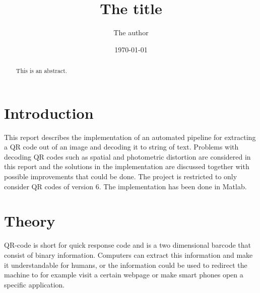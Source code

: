 \documentclass[12pt,a4paper]{article}
\begin{document}
 
\title{The title}
\author{The author}
\date{\today}
 
 
\newpage\null\thispagestyle{empty}\newpage
 
\newpage %
 
\begin{abstract}
  This is an abstract.
\end{abstract}
 
\newpage
 
\tableofcontents
 
\newpage{}
\section{Introduction}
This report describes the implementation of an automated pipeline for extracting a QR code out of an image and decoding it to string of text. Problems with decoding QR codes such as spatial and photometric distortion are considered in this report and the solutions in the implementation are discussed together with possible improvements that could be done. The project is restricted to only consider QR codes of version 6. The implementation has been done in Matlab.

\section{Theory}
QR-code is short for quick response code and is a two dimensional barcode that consist of binary information. Computers can extract this information and make it understandable for humans, or the information could be used to redirect the machine to for example visit a certain webpage or make smart phones open a specific application. 
\end{document}
